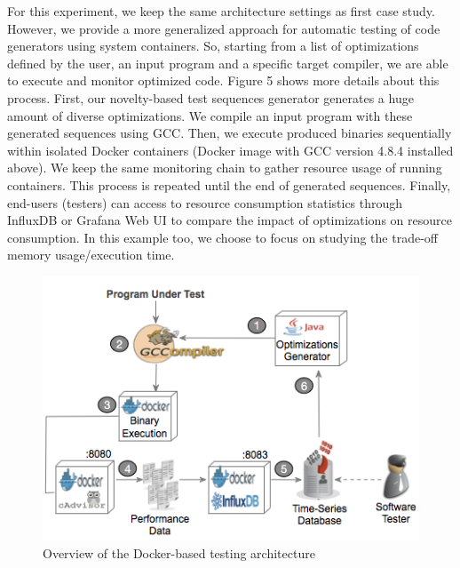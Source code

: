 For this experiment, we keep the same architecture settings as first case study. However, we provide a more generalized approach for automatic testing of code generators using system containers. So, starting from a list of optimizations defined by the user, an input program and a specific target compiler, we are able to execute and monitor optimized code. Figure 5 shows more details about this process. First, our novelty-based test sequences generator generates a huge amount of diverse optimizations. We compile an input program with these generated sequences using GCC. Then, we execute produced binaries sequentially within isolated Docker containers (Docker image with GCC version 4.8.4 installed above). We keep the same monitoring chain to gather resource usage of running containers. This process is repeated until the end of generated sequences. Finally, end-users (testers) can access to resource consumption statistics through InfluxDB or Grafana Web UI to compare the impact of optimizations on resource consumption. In this example too, we choose to focus on studying the trade-off memory usage/execution time. 
\begin{figure}[h]
	\centering
	\includegraphics[width=0.9\linewidth]{Ressources/infraup.png}
	\caption{Overview of the Docker-based testing architecture}
\end{figure}
